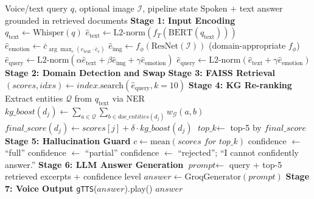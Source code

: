 \documentclass[12pt, a4paper]{article}
\theoremstyle{definition}
\theoremstyle{plain}
\theoremstyle{remark}
\newcommand{\KG}{\mathcal{G}}
\begin{document}
\begin{algorithm}[H]
\caption{MIVA\_KNIGHT\_INFERENCE (Full Pipeline)}
\label{alg:inference}
\begin{algorithmic}[1]
\Require Voice/text query $q$, optional image $\mathcal{I}$, pipeline state
\Ensure Spoken + text answer grounded in retrieved documents
\Statex \textbf{Stage 1: Input Encoding}
  \State $q_{\text{text}} \gets \text{Whisper}(q)$ 
\EndIf
\State $\hat{e}_{\text{text}} \gets \text{L2-norm}(f_T(\text{BERT}(q_{\text{text}})))$
\State $\hat{e}_{\text{emotion}} \gets \bar{c}_{\arg\max_e (\hat{e}_{\text{text}} \cdot \bar{c}_e)}$
  \State $\hat{e}_{\text{img}} \gets f_\phi(\text{ResNet}(\mathcal{I}))$ (domain-appropriate $f_\phi$)
  \State $\hat{e}_{\text{query}} \gets \text{L2-norm}(\alpha \hat{e}_{\text{text}} + \beta \hat{e}_{\text{img}} + \gamma \hat{e}_{\text{emotion}})$
\Else
  \State $\hat{e}_{\text{query}} \gets \text{L2-norm}(\hat{e}_{\text{text}} + \gamma \hat{e}_{\text{emotion}})$
\EndIf
\Statex \textbf{Stage 2: Domain Detection and Swap}
  \State {} 
\EndIf
\Statex \textbf{Stage 3: FAISS Retrieval}
\State $(\textit{scores}, \textit{idxs}) \gets \textit{index}.\text{search}(\hat{e}_{\text{query}}, k=10)$
\Statex \textbf{Stage 4: KG Re-ranking}
\State Extract entities $\mathcal{Q}$ from $q_{\text{text}}$ via NER
  \State $\textit{kg\_boost}(d_j) \gets \sum_{a \in \mathcal{Q}} \sum_{b \in \textit{doc\_entities}(d_j)} w_{\KG}(a,b)$
  \State $\textit{final\_score}(d_j) \gets \textit{scores}[j] + \delta \cdot \textit{kg\_boost}(d_j)$
\EndFor
\State $\textit{top\_k} \gets$ top-5 by $\textit{final\_score}$
\Statex \textbf{Stage 5: Hallucination Guard}
\State $c \gets \text{mean}(\textit{scores for top\_k})$
  \State confidence $\gets$ ``full''
  \State confidence $\gets$ ``partial''
\Else
  \State confidence $\gets$ ``rejected''; \Return ``I cannot confidently answer.''
\EndIf
\Statex \textbf{Stage 6: LLM Answer Generation}
\State $\textit{prompt} \gets$ query + top-5 retrieved excerpts + confidence level
\State $\textit{answer} \gets \text{GroqGenerator}(\textit{prompt})$ 
\Statex \textbf{Stage 7: Voice Output}
\State \texttt{gTTS}($\textit{answer}$).play() 
\State \Return $\textit{answer}$
\end{algorithmic}
\end{algorithm}
\end{document}
